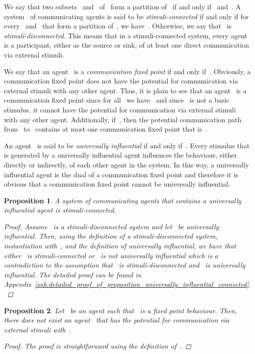 \documentclass[copyright,creativecommons]{eptcs}
\makeatletter
\newcommand{\PFC}{potential for communication\@\xspace}
\newcommand{\soca}{system of communicating agents\@\xspace}
\newcommand{\socaC}{system~ of communicating agents\@\xspace}
\newtheorem{proposition}{Proposition}
\makeatother
\begin{document}
We say that two subsets~ and~ of~ form a partition of~ if and only if~ and~. A \socaC is said to be \emph{stimuli-connected} if and only if for every~ and~ that form a partition of~, we have~. Otherwise, we say that~ is \emph{stimuli-disconnected}. This means that in a stimuli-connected system, every agent is a participant, either as the source or sink, of at least one direct communication via external stimuli.

We say that an agent~ is a \emph{communication fixed point} if and only if~. Obviously, a communication fixed point does not have the \PFC via external stimuli with any other agent. Thus, it is plain to see that an agent~ is a communication fixed point since for all~ we have~ and since~ is not a basic stimulus, it cannot have the \PFC via external stimuli with any other agent. Additionally, if~, then the potential communication path from~ to~ contains at most one communication fixed point that is~. 

An agent~ is said to be \emph{universally influential} if and only if~. Every stimulus that is generated by a universally influential agent influences the behaviour, either directly or indirectly, of each other agent in the system. In this way, a universally influential agent is the dual of a communication fixed point and therefore it is obvious that a communication fixed point cannot be universally influential. 

\begin{proposition}
\label{prop:universally_influential_connected}
	A \soca that contains a universally influential agent is stimuli-connected.
	
	\begin{proof}
		Assume~ is a stimuli-disconnected system and let~ be universally influential. Then, using the definition of a stimuli-disconnected system, instantiation with~, and the definition of universally influential, we have that either~ is stimuli-connected or~ is not universally influential which is a contradiction to the assumption that~ is stimuli-disconnected and~ is universally influential. The detailed proof can be found in Appendix~\ref{sub:detailed_proof_of_proposition_universally_influential_connected}.
	\end{proof}
\end{proposition}

\begin{proposition}
\label{prop:fixed_point}
	Let~ be an agent such that~ is a fixed point behaviour. Then, there does not exist an agent~ that has the \PFC via external stimuli with~.
	
	\begin{proof}
		The proof is straightforward using the definition of~.
	\end{proof}
\end{proposition}
\end{document}
